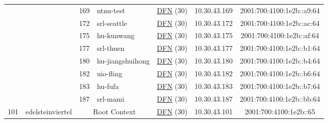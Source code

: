 \begin{small}
\begin{center}
\begin{longtable}{|c|c|c|c|c|c|c|c|}
  &  & \tiny{169} & \multicolumn{1}{|l|}{\tiny{ntnu-test}} & \multicolumn{2}{|c|}{\tiny{\href{https://www.dfn.de}{DFN} (30)}} & \tiny{10.30.43.169} & \tiny{2001:700:4100:1e2b::a9:64} \\* \cline{3-3}\cline{4-4}\cline{5-5}\cline{6-6}\cline{7-7}\cline{8-8}
  &  & \tiny{172} & \multicolumn{1}{|l|}{\tiny{srl-seattle}} & \multicolumn{2}{|c|}{\tiny{\href{https://www.dfn.de}{DFN} (30)}} & \tiny{10.30.43.172} & \tiny{2001:700:4100:1e2b::ac:64} \\* \cline{3-3}\cline{4-4}\cline{5-5}\cline{6-6}\cline{7-7}\cline{8-8}
  &  & \tiny{175} & \multicolumn{1}{|l|}{\tiny{hu-kunwang}} & \multicolumn{2}{|c|}{\tiny{\href{https://www.dfn.de}{DFN} (30)}} & \tiny{10.30.43.175} & \tiny{2001:700:4100:1e2b::af:64} \\* \cline{3-3}\cline{4-4}\cline{5-5}\cline{6-6}\cline{7-7}\cline{8-8}
  &  & \tiny{177} & \multicolumn{1}{|l|}{\tiny{srl-thuen}} & \multicolumn{2}{|c|}{\tiny{\href{https://www.dfn.de}{DFN} (30)}} & \tiny{10.30.43.177} & \tiny{2001:700:4100:1e2b::b1:64} \\* \cline{3-3}\cline{4-4}\cline{5-5}\cline{6-6}\cline{7-7}\cline{8-8}
  &  & \tiny{180} & \multicolumn{1}{|l|}{\tiny{hu-jiangshuihong}} & \multicolumn{2}{|c|}{\tiny{\href{https://www.dfn.de}{DFN} (30)}} & \tiny{10.30.43.180} & \tiny{2001:700:4100:1e2b::b4:64} \\* \cline{3-3}\cline{4-4}\cline{5-5}\cline{6-6}\cline{7-7}\cline{8-8}
  &  & \tiny{182} & \multicolumn{1}{|l|}{\tiny{uio-fling}} & \multicolumn{2}{|c|}{\tiny{\href{https://www.dfn.de}{DFN} (30)}} & \tiny{10.30.43.182} & \tiny{2001:700:4100:1e2b::b6:64} \\* \cline{3-3}\cline{4-4}\cline{5-5}\cline{6-6}\cline{7-7}\cline{8-8}
  &  & \tiny{183} & \multicolumn{1}{|l|}{\tiny{hu-fufa}} & \multicolumn{2}{|c|}{\tiny{\href{https://www.dfn.de}{DFN} (30)}} & \tiny{10.30.43.183} & \tiny{2001:700:4100:1e2b::b7:64} \\* \cline{3-3}\cline{4-4}\cline{5-5}\cline{6-6}\cline{7-7}\cline{8-8}
  &  & \tiny{187} & \multicolumn{1}{|l|}{\tiny{srl-mami}} & \multicolumn{2}{|c|}{\tiny{\href{https://www.dfn.de}{DFN} (30)}} & \tiny{10.30.43.187} & \tiny{2001:700:4100:1e2b::bb:64} \\ \hline
 \multirow{21}{*}{\tiny{101}} & \multicolumn{1}{|l|}{\multirow{21}{*}{\tiny{edelsteinviertel}}} & \multicolumn{2}{|c|}{\tiny{Root Context}} & \multicolumn{2}{|c|}{\tiny{\href{https://www.dfn.de}{DFN} (30)}} & \tiny{10.30.43.101} & \tiny{2001:700:4100:1e2b::65} \\* \cline{3-3}\cline{4-4}\cline{5-5}\cline{6-6}\cline{7-7}\cline{8-8}

\end{longtable}
\end{center}
\end{small}
